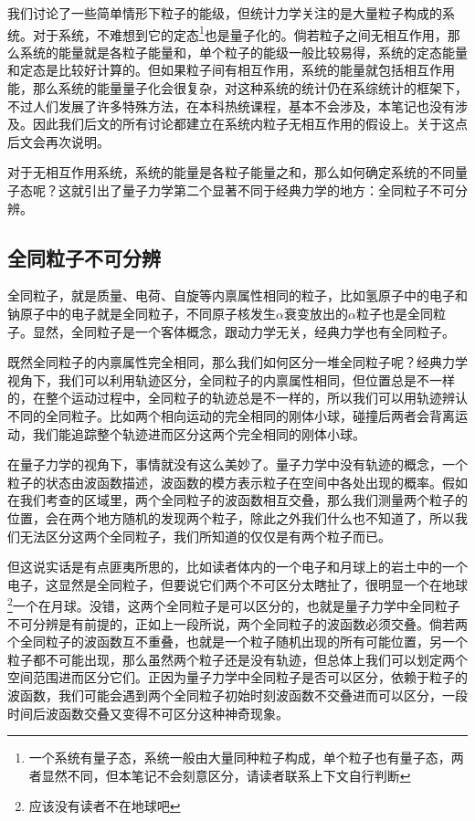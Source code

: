 \documentclass[../../main.tex]{subfiles}
\begin{document}
我们讨论了一些简单情形下粒子的能级，但统计力学关注的是大量粒子构成的系统。对于系统，不难想到它的定态\footnote{一个系统有量子态，系统一般由大量同种粒子构成，单个粒子也有量子态，两者显然不同，但本笔记不会刻意区分，请读者联系上下文自行判断}也是量子化的。倘若粒子之间无相互作用，那么系统的能量就是各粒子能量和，单个粒子的能级一般比较易得，系统的定态能量和定态是比较好计算的。但如果粒子间有相互作用，系统的能量就包括相互作用能，那么系统的能量量子化会很复杂，对这种系统的统计仍在系综统计的框架下，不过人们发展了许多特殊方法，在本科热统课程，基本不会涉及，本笔记也没有涉及。因此我们后文的所有讨论都建立在系统内粒子无相互作用的假设上。关于这点后文会再次说明。

对于无相互作用系统，系统的能量是各粒子能量之和，那么如何确定系统的不同量子态呢？这就引出了量子力学第二个显著不同于经典力学的地方：全同粒子不可分辨。

\subsection{全同粒子不可分辨}

全同粒子，就是质量、电荷、自旋等内禀属性相同的粒子，比如氢原子中的电子和钠原子中的电子就是全同粒子，不同原子核发生\(\alpha\)衰变放出的\(\alpha\)粒子也是全同粒子。显然，全同粒子是一个客体概念，跟动力学无关，经典力学也有全同粒子。

既然全同粒子的内禀属性完全相同，那么我们如何区分一堆全同粒子呢？经典力学视角下，我们可以利用轨迹区分，全同粒子的内禀属性相同，但位置总是不一样的，在整个运动过程中，全同粒子的轨迹总是不一样的，所以我们可以用轨迹辨认不同的全同粒子。比如两个相向运动的完全相同的刚体小球，碰撞后两者会背离运动，我们能追踪整个轨迹进而区分这两个完全相同的刚体小球。

在量子力学的视角下，事情就没有这么美妙了。量子力学中没有轨迹的概念，一个粒子的状态由波函数描述，波函数的模方表示粒子在空间中各处出现的概率。假如在我们考查的区域里，两个全同粒子的波函数相互交叠，那么我们测量两个粒子的位置，会在两个地方随机的发现两个粒子，除此之外我们什么也不知道了，所以我们无法区分这两个全同粒子，我们所知道的仅仅是有两个粒子而已。

但这说实话是有点匪夷所思的，比如读者体内的一个电子和月球上的岩土中的一个电子，这显然是全同粒子，但要说它们两个不可区分太瞎扯了，很明显一个在地球\footnote{应该没有读者不在地球吧}一个在月球。没错，这两个全同粒子是可以区分的，也就是量子力学中全同粒子不可分辨是有前提的，正如上一段所说，两个全同粒子的波函数必须交叠。倘若两个全同粒子的波函数互不重叠，也就是一个粒子随机出现的所有可能位置，另一个粒子都不可能出现，那么虽然两个粒子还是没有轨迹，但总体上我们可以划定两个空间范围进而区分它们。正因为量子力学中全同粒子是否可以区分，依赖于粒子的波函数，我们可能会遇到两个全同粒子初始时刻波函数不交叠进而可以区分，一段时间后波函数交叠又变得不可区分这种神奇现象。
\end{document}
